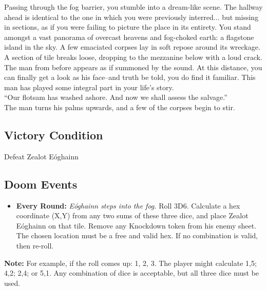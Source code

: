 Passing through the fog barrier, you stumble into a dream-like scene. The hallway ahead is identical to the one in which you were previously interred... but missing in sections, as if you were failing to picture the place in its entirety. You stand amongst a vast panorama of overcast heavens and fog-choked earth: a flagstone island in the sky. A few emaciated corpses lay in soft repose around its wreckage.\\

A section of tile breaks loose, dropping to the mezzanine below with a loud crack.\\

The man from before appears as if summoned by the sound. At this distance, you can finally get a look as his face--and truth be told, you do find it familiar. This man has played some integral part in your life’s story.\\

“Our flotsam has washed ashore. And now we shall assess the salvage.”\\

The man turns his palms upwards, and a few of the corpses begin to stir.\\

\subsection*{Victory Condition}
Defeat Zealot Eóghainn

\subsection*{Doom Events}
\begin{itemize}
\item \textbf{Every Round:} \emph{Eóghainn steps into the fog.} Roll 3D6. Calculate a hex coordinate (X,Y) from any two sums of these three dice, and place Zealot Eóghainn on that tile. Remove any Knockdown token from his enemy sheet. The chosen location must be a free and valid hex. If no combination is valid, then re-roll.
\end{itemize}

\begin{tcolorbox}
\textbf{Note:} For example, if the roll comes up: 1, 2, 3. The player might calculate 1,5; 4,2; 2,4; or 5,1. Any combination of dice is acceptable, but all three dice must be used.
\end{tcolorbox}

\pagebreak

